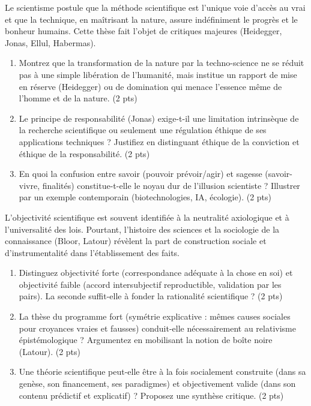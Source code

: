 \documentclass[11pt]{article}
\begin{document}
\begin{exercice}
Le scientisme postule que la méthode scientifique est l'unique voie d'accès au vrai et que la technique, en maîtrisant la nature, assure indéfiniment le progrès et le bonheur humains. Cette thèse fait l'objet de critiques majeures (Heidegger, Jonas, Ellul, Habermas).

\begin{enumerate}
    \item Montrez que la transformation de la nature par la techno-science ne se réduit pas à une simple \og libération \fg{} de l'humanité, mais institue un rapport de \og mise en réserve \fg{} (Heidegger) ou de \og domination \fg{} qui menace l'essence même de l'homme et de la nature. \hfill (2 pts)
    \item Le principe de responsabilité (Jonas) exige-t-il une limitation intrinsèque de la recherche scientifique ou seulement une régulation éthique de ses applications techniques ? Justifiez en distinguant éthique de la conviction et éthique de la responsabilité. \hfill (2 pts)
    \item En quoi la confusion entre \og savoir \fg{} (pouvoir prévoir/agir) et \og sagesse \fg{} (savoir-vivre, finalités) constitue-t-elle le noyau dur de l'illusion scientiste ? Illustrer par un exemple contemporain (biotechnologies, IA, écologie). \hfill (2 pts)
\end{enumerate}
\end{exercice}

\begin{exercice}
L'objectivité scientifique est souvent identifiée à la neutralité axiologique et à l'universalité des lois. Pourtant, l'histoire des sciences et la sociologie de la connaissance (Bloor, Latour) révèlent la part de construction sociale et d'instrumentalité dans l'établissement des faits.

\begin{enumerate}
    \item Distinguez objectivité \og forte \fg{} (correspondance adéquate à la chose en soi) et objectivité \og faible \fg{} (accord intersubjectif reproductible, validation par les pairs). La seconde suffit-elle à fonder la rationalité scientifique ? \hfill (2 pts)
    \item La thèse du \og programme fort \fg{} (symétrie explicative : mêmes causes sociales pour croyances vraies et fausses) conduit-elle nécessairement au relativisme épistémologique ? Argumentez en mobilisant la notion de \og boîte noire \fg{} (Latour). \hfill (2 pts)
    \item Une théorie scientifique peut-elle être à la fois \og socialement construite \fg{} (dans sa genèse, son financement, ses paradigmes) et \og objectivement valide \fg{} (dans son contenu prédictif et explicatif) ? Proposez une synthèse critique. \hfill (2 pts)
\end{enumerate}
\end{exercice}
\end{document}
